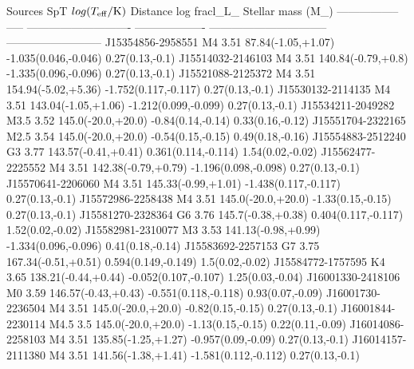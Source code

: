 Sources            SpT    $log(T_{\rm{eff}}/\rm{K})$    Distance             log frac{l_{\star}}{L_{\odot}}    Stellar mass (M_{\star})
-----------------  -----  ----------------------------  -------------------  --------------------------------  --------------------------
J15354856-2958551  M4     3.51                   87.84(-1.05,+1.07)   -1.035(0.046,-0.046)              0.27(0.13,-0.1)
J15514032-2146103  M4     3.51                   140.84(-0.79,+0.8)   -1.335(0.096,-0.096)              0.27(0.13,-0.1)
J15521088-2125372  M4     3.51                   154.94(-5.02,+5.36)  -1.752(0.117,-0.117)              0.27(0.13,-0.1)
J15530132-2114135  M4     3.51                   143.04(-1.05,+1.06)  -1.212(0.099,-0.099)              0.27(0.13,-0.1)
J15534211-2049282  M3.5   3.52                   145.0(-20.0,+20.0)   -0.84(0.14,-0.14)                 0.33(0.16,-0.12)
J15551704-2322165  M2.5   3.54                   145.0(-20.0,+20.0)   -0.54(0.15,-0.15)                 0.49(0.18,-0.16)
J15554883-2512240  G3     3.77                   143.57(-0.41,+0.41)  0.361(0.114,-0.114)               1.54(0.02,-0.02)
J15562477-2225552  M4     3.51                   142.38(-0.79,+0.79)  -1.196(0.098,-0.098)              0.27(0.13,-0.1)
J15570641-2206060  M4     3.51                   145.33(-0.99,+1.01)  -1.438(0.117,-0.117)              0.27(0.13,-0.1)
J15572986-2258438  M4     3.51                   145.0(-20.0,+20.0)   -1.33(0.15,-0.15)                 0.27(0.13,-0.1)
J15581270-2328364  G6     3.76                   145.7(-0.38,+0.38)   0.404(0.117,-0.117)               1.52(0.02,-0.02)
J15582981-2310077  M3     3.53                   141.13(-0.98,+0.99)  -1.334(0.096,-0.096)              0.41(0.18,-0.14)
J15583692-2257153  G7     3.75                   167.34(-0.51,+0.51)  0.594(0.149,-0.149)               1.5(0.02,-0.02)
J15584772-1757595  K4     3.65                   138.21(-0.44,+0.44)  -0.052(0.107,-0.107)              1.25(0.03,-0.04)
J16001330-2418106  M0     3.59                   146.57(-0.43,+0.43)  -0.551(0.118,-0.118)              0.93(0.07,-0.09)
J16001730-2236504  M4     3.51                   145.0(-20.0,+20.0)   -0.82(0.15,-0.15)                 0.27(0.13,-0.1)
J16001844-2230114  M4.5   3.5                    145.0(-20.0,+20.0)   -1.13(0.15,-0.15)                 0.22(0.11,-0.09)
J16014086-2258103  M4     3.51                   135.85(-1.25,+1.27)  -0.957(0.09,-0.09)                0.27(0.13,-0.1)
J16014157-2111380  M4     3.51                   141.56(-1.38,+1.41)  -1.581(0.112,-0.112)              0.27(0.13,-0.1)

